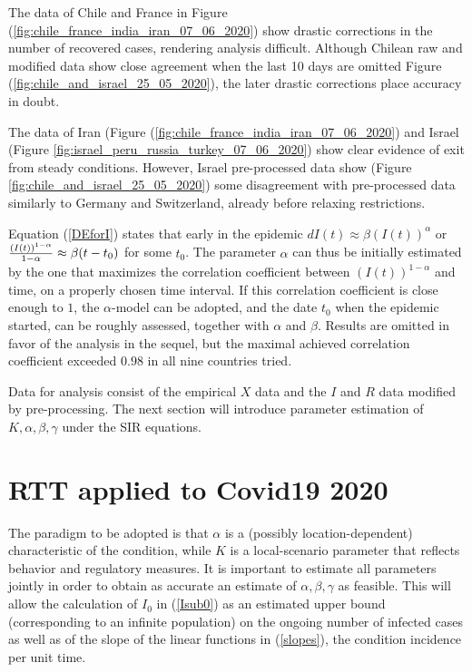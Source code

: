 \documentclass{article}
\begin{document}
The data of Chile and France in Figure (\ref{fig:chile_france_india_iran_07_06_2020}) show drastic corrections in the number of recovered cases, rendering analysis difficult. Although Chilean raw and modified data show close agreement when the last 10 days are omitted Figure (\ref{fig:chile_and_israel_25_05_2020}), the later drastic corrections place accuracy in doubt.

The data of Iran (Figure (\ref{fig:chile_france_india_iran_07_06_2020}) and Israel (Figure \ref{fig:israel_peru_russia_turkey_07_06_2020}) show clear evidence of exit from steady conditions. However, Israel pre-processed data show (Figure \ref{fig:chile_and_israel_25_05_2020}) some disagreement with pre-processed data similarly to Germany and Switzerland, already before relaxing restrictions.

\bigskip

Equation (\ref{DEforI}) states that early in the epidemic $dI(t) \approx \beta (I(t))^\alpha$ or ${{(I(t))^{1-\alpha}} \over  {1-\alpha}} \approx \beta (t-t_0)$ for some $t_0$.
The parameter $\alpha$ can thus be initially estimated by the one that maximizes the correlation coefficient between $(I(t))^{1-\alpha}$ and time, on a properly chosen time interval. If this correlation coefficient is close enough to $1$, the $\alpha$-model can be adopted, and the date $t_0$ when the epidemic started, can be roughly assessed, together with $\alpha$ and $\beta$. Results are omitted in favor of the analysis in the sequel, but
the maximal achieved correlation coefficient exceeded $0.98$ in all nine countries tried.

\bigskip

Data for analysis consist of the empirical $X$ data and the $I$ and $R$ data modified by pre-processing. The next section will introduce parameter estimation of $K,\alpha, \beta,\gamma$ under the SIR equations.

\section{RTT applied to Covid19 2020} \label{RTTsection}

The paradigm to be adopted is that $\alpha$ is a (possibly location-dependent) characteristic of the condition, while $K$ is a local-scenario parameter that reflects behavior and regulatory measures. It is important to estimate all parameters jointly in order to obtain as accurate an estimate of $\alpha, \beta, \gamma$ as feasible. This will allow the calculation of $I_0$ in (\ref{Isub0}) as an estimated upper bound (corresponding to an infinite population) on the ongoing number of infected cases as well as of the slope of the linear functions in (\ref{slopes}), the condition incidence per unit time.
\end{document}
